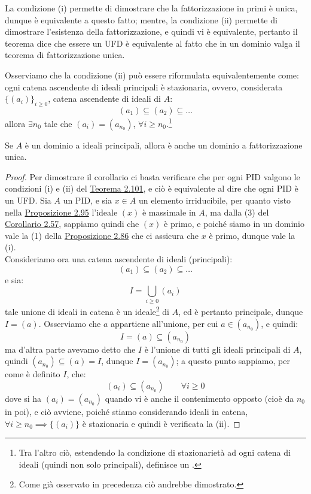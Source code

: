 \documentclass[11pt]{scrartcl}
\begin{document}
\begin{remark}
    La condizione (i) permette di dimostrare che la fattorizzazione in primi è unica, dunque è equivalente a questo fatto; mentre, la condizione (ii) 
    permette di dimostrare l'esistenza della fattorizzazione, e quindi vi è equivalente, pertanto il teorema dice che essere un UFD è equivalente al 
    fatto che in un dominio valga il teorema di fattorizzazione unica.
\end{remark}

\begin{remark}
    Osserviamo che la condizione (ii) può essere riformulata equivalentemente come: ogni catena ascendente di ideali principali è stazionaria, ovvero,
    considerata $\{(a_i)\}_{i \geq 0}$, catena  ascendente di ideali di $A$:
    \[ (a_1) \subseteq (a_2) \subseteq \ldots
        \]
    allora $\exists n_0$ tale che $(a_i) = (a_{n_0})$, $\forall i \geq n_0$.\footnote{Tra l'altro ciò, estendendo la condizione di stazionarietà ad ogni catena di ideali (quindi non solo principali), definisce un .}
\end{remark}

\pagebreak

\begin{corollary}
    Se $A$ è un dominio a ideali principali, allora è anche un dominio a fattorizzazione unica.
\end{corollary}

\begin{proof}
    Per dimostrare il corollario ci basta verificare che per ogni PID valgono le condizioni (i) e (ii) del \hyperref[2.101]{Teorema 2.101}, e ciò è equivalente al dire che ogni PID è un UFD.
    Sia $A$ un PID, e sia $x \in A$ un elemento irriducibile, per quanto visto nella \hyperref[2.95]{Proposizione 2.95} l'ideale $(x)$ è massimale in $A$, ma dalla (3) del \hyperref[2.57]{Corollario 2.57}, sappiamo quindi che 
    $(x)$ è primo, e poiché siamo in un dominio vale la (1) della \hyperref[2.86]{Proposizione 2.86} che ci assicura che $x$ è primo, dunque vale la (i).\\
    Consideriamo ora una catena ascendente di ideali (principali):
    \[ (a_1) \subseteq (a_2) \subseteq \ldots
        \]
    e sia:
    \[ I = \bigcup_{i \geq 0} (a_i)
        \]
    tale unione di ideali in catena è un ideale\footnote{Come già osservato in precedenza ciò andrebbe dimostrato.} di $A$, ed è pertanto principale, dunque $I = (a)$.
    Osserviamo che $a$ appartiene all'unione, per cui $a \in (a_{n_0})$, e quindi:
    \[ I = (a) \subseteq (a_{n_0})
        \]
    ma d'altra parte avevamo detto che $I$ è l'unione di tutti gli ideali principali di $A$, quindi $(a_{n_0}) \subseteq (a) = I $, dunque $I = (a_{n_0})$; a questo punto sappiamo, per come è definito $I$, che:
    \[ (a_i) \subseteq (a_{n_0}) \qquad \forall i \geq 0
        \]
    dove si ha $(a_i) = (a_{n_0})$ quando vi è anche il contenimento opposto (cioè da $n_0$ in poi), e ciò avviene, poiché stiamo considerando ideali in catena, $\forall i \geq n_0 \implies \{(a_i)\}$ è stazionaria e quindi è verificata la (ii).
\end{proof}
\end{document}
